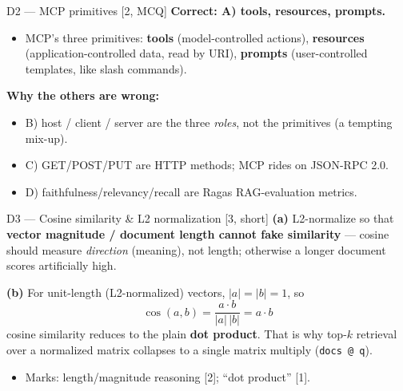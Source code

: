 \documentclass[aspectratio=169,11pt]{beamer}
\begin{document}
\begin{frame}{D2 --- MCP primitives \hfill [2, MCQ]}
\textbf{Correct: A) tools, resources, prompts.}
\begin{itemize}
  \item MCP's three primitives: \textbf{tools} (model-controlled actions), \textbf{resources} (application-controlled data, read by URI), \textbf{prompts} (user-controlled templates, like slash commands).
\end{itemize}
\textbf{Why the others are wrong:}
\begin{itemize}
  \item B) host / client / server are the three \emph{roles}, not the primitives (a tempting mix-up).
  \item C) GET/POST/PUT are HTTP methods; MCP rides on JSON-RPC 2.0.
  \item D) faithfulness/relevancy/recall are Ragas RAG-evaluation metrics.
\end{itemize}
\end{frame}

\begin{frame}{D3 --- Cosine similarity \& L2 normalization \hfill [3, short]}
\textbf{(a)} L2-normalize so that \textbf{vector magnitude / document length cannot fake similarity} --- cosine should measure \emph{direction} (meaning), not length; otherwise a longer document scores artificially high.

\medskip
\textbf{(b)} For unit-length (L2-normalized) vectors, $|a| = |b| = 1$, so
\[
\cos(a,b) = \frac{a \cdot b}{|a|\,|b|} = a \cdot b
\]
cosine similarity reduces to the plain \textbf{dot product}. That is why top-$k$ retrieval over a normalized matrix collapses to a single matrix multiply (\texttt{docs @ q}).
\begin{itemize}
  \item Marks: length/magnitude reasoning [2]; ``dot product'' [1].
\end{itemize}
\end{frame}
\end{document}
